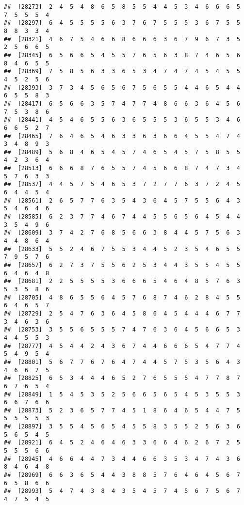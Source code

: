 \documentclass[
]{book}
\begin{document}
\begin{verbatim}
##  [28273]  2  4  5  4  8  6  5  8  5  5  4  4  5  3  4  6  6  6  5  7  5  5  5  4
##  [28297]  6  4  5  5  5  5  6  3  7  6  7  5  5  5  3  6  7  5  5  8  8  3  3  4
##  [28321]  4  6  7  5  4  6  6  8  6  6  6  3  6  7  9  6  7  3  5  2  5  6  6  5
##  [28345]  6  5  6  6  5  4  5  5  7  6  5  6  3  8  7  4  6  5  6  8  4  6  5  5
##  [28369]  7  5  8  5  6  3  3  6  5  3  4  7  4  7  4  5  4  5  5  4  5  2  5  6
##  [28393]  3  7  3  4  5  6  5  6  7  5  6  5  5  4  4  6  5  4  4  6  5  5  8  3
##  [28417]  6  5  6  6  3  5  7  4  7  7  4  8  6  6  3  6  4  5  6  7  5  3  8  6
##  [28441]  4  5  4  6  5  5  6  3  6  5  5  5  3  6  5  5  3  4  6  6  6  5  2  7
##  [28465]  7  6  4  6  5  4  6  3  3  6  3  6  6  4  5  5  4  7  4  3  4  8  9  3
##  [28489]  5  6  8  4  6  5  4  5  7  4  6  5  4  5  7  5  8  5  5  4  2  3  6  4
##  [28513]  6  6  6  8  7  6  5  5  7  4  5  6  6  8  7  4  7  3  4  5  7  6  3  3
##  [28537]  4  4  5  7  5  4  6  5  3  7  2  7  7  6  3  7  2  4  5  6  4  4  5  4
##  [28561]  2  6  5  7  7  6  3  5  4  3  6  4  5  7  5  5  6  4  3  5  4  6  4  6
##  [28585]  6  2  3  7  7  4  6  7  4  4  5  5  6  5  6  4  5  4  4  3  5  4  9  6
##  [28609]  3  7  4  2  7  6  8  5  6  6  3  8  4  4  5  7  5  6  3  4  4  8  6  4
##  [28633]  5  5  2  4  6  7  5  5  3  4  4  5  2  3  5  4  6  5  5  7  9  5  7  6
##  [28657]  6  2  7  3  7  5  5  6  2  5  3  4  4  3  5  5  4  5  5  6  4  6  4  8
##  [28681]  2  2  5  5  5  5  3  6  6  6  5  4  6  4  8  5  7  6  3  5  3  5  8  6
##  [28705]  4  8  6  5  5  6  4  5  7  6  8  7  4  6  2  8  4  5  5  6  4  6  5  7
##  [28729]  2  5  4  7  6  3  6  4  5  8  6  4  5  4  4  4  6  7  7  3  4  6  3  6
##  [28753]  3  5  5  6  5  5  5  7  4  7  6  3  6  4  5  6  6  5  3  4  4  5  5  3
##  [28777]  4  5  4  4  2  4  3  6  7  4  4  6  6  6  5  4  7  7  4  5  4  9  5  4
##  [28801]  5  6  7  7  6  7  6  4  7  4  4  5  7  5  3  5  6  4  3  4  6  6  7  5
##  [28825]  6  5  3  4  4  4  6  5  2  7  6  5  5  5  4  7  7  8  7  6  7  6  5  4
##  [28849]  1  5  4  5  3  5  2  5  6  6  5  6  5  4  5  3  5  5  3  6  6  7  6  6
##  [28873]  5  2  3  6  5  7  7  4  5  1  8  6  4  6  5  4  4  7  5  5  5  5  5  3
##  [28897]  3  5  5  4  5  6  5  4  5  5  8  3  5  5  2  5  6  3  6  5  6  5  4  5
##  [28921]  6  4  5  2  4  6  4  6  3  3  6  6  4  6  2  6  7  2  5  5  5  5  6  6
##  [28945]  4  6  6  4  4  7  3  4  4  6  6  3  5  3  4  7  4  3  6  8  4  6  4  8
##  [28969]  6  6  3  6  5  4  4  3  8  8  5  7  6  4  6  4  5  6  7  6  5  8  6  6
##  [28993]  5  4  7  4  3  8  4  3  5  4  5  7  4  5  6  7  5  6  7  4  7  5  4  5

\end{verbatim}
\end{document}
